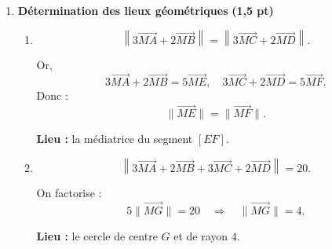 \documentclass[12pt,a4paper]{article}
\begin{document}
\begin{enumerate}
\begin{enumerate}
\item \textbf{Montrer que $J=\mathrm{bar}\{(B,-1),(D,2)\}$} \hfill \textbf{(0,5 pt)}

Comme $D$ est le milieu de $[BJ]$, on a :
\[
\overrightarrow{DB}+\overrightarrow{DJ}=\vec{0}
\quad \Longrightarrow \quad
\overrightarrow{DJ}=-\overrightarrow{DB}.
\]
Cela correspond à l’écriture barycentrique :
\[
J=\mathrm{bar}\{(B,-1),(D,2)\}.
\]

\item \textbf{Montrer que $I$, $J$ et $G$ sont alignés} \hfill \textbf{(0,5 pt)}

On écrit :
\[
\begin{aligned}
G &= \mathrm{bar}\{(A,3),(B,2),(C,3),(D,2)\} \\
  &= \mathrm{bar}\{(A,1),(B,1),(C,1),(B,-1),(D,2)\} \\
  &= \mathrm{bar}\{(I,3),(J,1)\}.
\end{aligned}
\]
Ainsi, $G$ est le barycentre de $I$ et $J$, donc les points $I$, $J$ et $G$ sont \textbf{alignés}.

\end{enumerate}

\item \textbf{Détermination des lieux géométriques} \hfill \textbf{(1,5 pt)}

\begin{enumerate}

\item 
\[
\left\|3\overrightarrow{MA}+2\overrightarrow{MB}\right\|
=
\left\|3\overrightarrow{MC}+2\overrightarrow{MD}\right\|.
\]

Or,
\[
3\overrightarrow{MA}+2\overrightarrow{MB}=5\overrightarrow{ME},
\quad
3\overrightarrow{MC}+2\overrightarrow{MD}=5\overrightarrow{MF}.
\]
Donc :
\[
\|\overrightarrow{ME}\|=\|\overrightarrow{MF}\|.
\]

\medskip
\textbf{Lieu :} la médiatrice du segment $[EF]$.

\item 
\[
\left\|3\overrightarrow{MA}+2\overrightarrow{MB}+3\overrightarrow{MC}+2\overrightarrow{MD}\right\|=20.
\]

On factorise :
\[
5\|\overrightarrow{MG}\|=20
\quad \Longrightarrow \quad
\|\overrightarrow{MG}\|=4.
\]

\medskip
\textbf{Lieu :} le cercle de centre $G$ et de rayon $4$.

\end{enumerate}

\end{enumerate}
\end{document}
